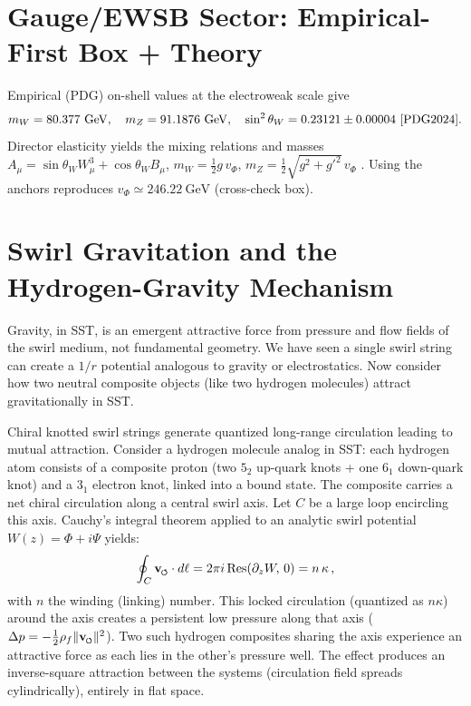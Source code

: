 \documentclass[reprint,aps,onecolumn,nofootinbib]{revtex4-2}
\newcommand{\swirlarrow}{%
    \mathchoice{\mkern-2mu\scriptstyle\boldsymbol{\circlearrowleft}}%
    {\mkern-2mu\scriptstyle\boldsymbol{\circlearrowleft}}%
    {\mkern-2mu\scriptscriptstyle\boldsymbol{\circlearrowleft}}%
    {\mkern-2mu\scriptscriptstyle\boldsymbol{\circlearrowleft}}%
}
\newcommand{\vswirl}{\mathbf{v}_{\swirlarrow}}
\begin{document}
    \section{Gauge/EWSB Sector: Empirical-First Box + Theory}\label{canon58:gauge-openers}
    Empirical (PDG) on-shell values at the electroweak scale give
    \[
        m_W=80.377~\mathrm{GeV},\quad m_Z=91.1876~\mathrm{GeV},\quad \sin^2\theta_W=0.23121\pm0.00004 \ \cite{PDG2024}.
    \]
    Director elasticity yields the mixing relations and masses
    $A_\mu=\sin\theta_W W^3_\mu+\cos\theta_W B_\mu$,
    $m_W=\tfrac12 g\,v_\Phi$, $m_Z=\tfrac12\sqrt{g^2+g'^2}\,v_\Phi$ \cite{Weinberg1967,PeskinSchroeder1995}.
    Using the anchors reproduces $v_\Phi\simeq 246.22~\mathrm{GeV}$ (cross-check box). %



    \section{Swirl Gravitation and the Hydrogen-Gravity Mechanism}
        Gravity, in SST, is an emergent attractive force from pressure and flow fields of the swirl medium, not fundamental geometry. We have seen a single swirl string can create a $1/r$ potential analogous to gravity or electrostatics. Now consider how two neutral composite objects (like two hydrogen molecules) attract gravitationally in SST.

        \begin{tcolorbox}[title=Theorem 7.1: Hydrogen-Gravity Mechanism (Swirl Attraction in Flat Space)]
        Chiral knotted swirl strings generate quantized long-range circulation leading to mutual attraction. Consider a hydrogen molecule analog in SST: each hydrogen atom consists of a composite proton (two $5_2$ up-quark knots + one $6_1$ down-quark knot) and a $3_1$ electron knot, linked into a bound state. The composite carries a net chiral circulation along a central swirl axis. Let $C$ be a large loop encircling this axis. Cauchy’s integral theorem applied to an analytic swirl potential $W(z) = \Phi + i\Psi$ yields:
        \[
            \oint_C \vswirl \cdot d\ell = 2\pi i \,\text{Res}(\partial_z W,\,0) = n\,\kappa\,,
        \]
        with $n$ the winding (linking) number. This locked circulation (quantized as $n\kappa$) around the axis creates a persistent low pressure along that axis ($\Delta p = -\frac{1}{2}\rho_f \|\vswirl\|^2$). Two such hydrogen composites sharing the axis experience an attractive force as each lies in the other’s pressure well. The effect produces an inverse-square attraction between the systems (circulation field spreads cylindrically), entirely in flat space.
        \end{tcolorbox}
\end{document}
